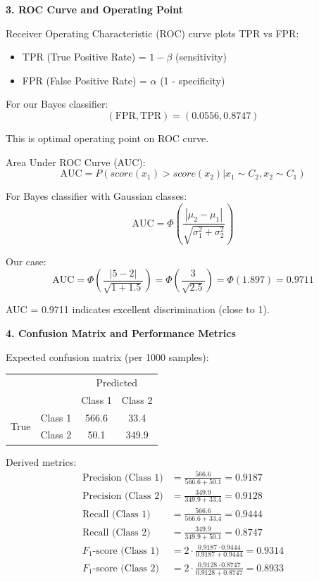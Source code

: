 \documentclass[12pt]{article}
\begin{document}
\begin{explanation}
\textbf{3. ROC Curve and Operating Point}

Receiver Operating Characteristic (ROC) curve plots TPR vs FPR:
\begin{itemize}
\item TPR (True Positive Rate) = $1 - \beta$ (sensitivity)
\item FPR (False Positive Rate) = $\alpha$ (1 - specificity)
\end{itemize}

For our Bayes classifier:
\[(\text{FPR}, \text{TPR}) = (0.0556, 0.8747)\]

This is optimal operating point on ROC curve.

Area Under ROC Curve (AUC):
\[\text{AUC} = P(score(x_1) > score(x_2) | x_1 \sim C_2, x_2 \sim C_1)\]

For Bayes classifier with Gaussian classes:
\[\text{AUC} = \Phi\left(\frac{|\mu_2 - \mu_1|}{\sqrt{\sigma_1^2 + \sigma_2^2}}\right)\]

Our case:
\[\text{AUC} = \Phi\left(\frac{|5 - 2|}{\sqrt{1 + 1.5}}\right) = \Phi\left(\frac{3}{\sqrt{2.5}}\right) = \Phi(1.897) = 0.9711\]

AUC = 0.9711 indicates excellent discrimination (close to 1).

\textbf{4. Confusion Matrix and Performance Metrics}

Expected confusion matrix (per 1000 samples):

\begin{center}
\begin{tabular}{cc|cc}
& & \multicolumn{2}{c}{Predicted} \\
& & Class 1 & Class 2 \\
\hline
\multirow{2}{*}{True} & Class 1 & 566.6 & 33.4 \\
& Class 2 & 50.1 & 349.9 \\
\end{tabular}
\end{center}

Derived metrics:
\begin{align*}
\text{Precision (Class 1)} &= \frac{566.6}{566.6 + 50.1} = 0.9187 \\
\text{Precision (Class 2)} &= \frac{349.9}{349.9 + 33.4} = 0.9128 \\
\text{Recall (Class 1)} &= \frac{566.6}{566.6 + 33.4} = 0.9444 \\
\text{Recall (Class 2)} &= \frac{349.9}{349.9 + 50.1} = 0.8747 \\
F_1\text{-score (Class 1)} &= 2 \cdot \frac{0.9187 \cdot 0.9444}{0.9187 + 0.9444} = 0.9314 \\
F_1\text{-score (Class 2)} &= 2 \cdot \frac{0.9128 \cdot 0.8747}{0.9128 + 0.8747} = 0.8933
\end{align*}


\end{explanation}
\end{document}
